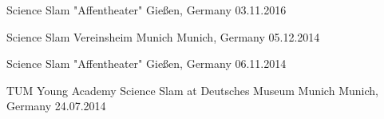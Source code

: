 \begin{cvhonors}
\cvhonor
{Science Slam "Affentheater"} %
{Gießen, Germany} %
{} %
{03.11.2016} %

\cvhonor
{Science Slam Vereinsheim Munich} %
{Munich, Germany} %
{} %
{05.12.2014} %

\cvhonor
{Science Slam "Affentheater"} %
{Gießen, Germany} %
{} %
{06.11.2014} %

\cvhonor
{TUM Young Academy Science Slam at Deutsches Museum Munich} %
{Munich, Germany} %
{} %
{24.07.2014} %

\end{cvhonors}


